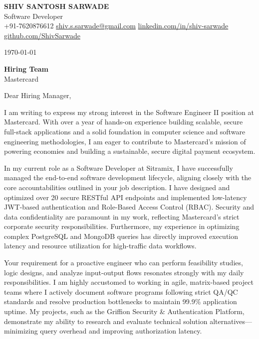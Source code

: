 \documentclass[a4paper,10pt]{article}
\begin{document}
\pagestyle{empty}

\begin{center}
    {\LARGE \textbf{SHIV SANTOSH SARWADE}}\\
    Software Developer\\[4pt]
    +91-7620876612 \quad
    \href{mailto:shiv.s.sarwade@gmail.com}{shiv.s.sarwade@gmail.com} \quad
    \href{https://linkedin.com/in/shiv-sarwade}{linkedin.com/in/shiv-sarwade} \quad
    \href{https://github.com/ShivSarwade}{github.com/ShivSarwade}
\end{center}

\vspace{2em}

\today

\textbf{Hiring Team}\\
Mastercard\\
\vspace{1em}

Dear Hiring Manager,

I am writing to express my strong interest in the Software Engineer II position at Mastercard. With over a year of hands-on experience building scalable, secure full-stack applications and a solid foundation in computer science and software engineering methodologies, I am eager to contribute to Mastercard's mission of powering economies and building a sustainable, secure digital payment ecosystem.

In my current role as a Software Developer at Sitramix, I have successfully managed the end-to-end software development lifecycle, aligning closely with the core accountabilities outlined in your job description. I have designed and optimized over 20 secure RESTful API endpoints and implemented low-latency JWT-based authentication and Role-Based Access Control (RBAC). Security and data confidentiality are paramount in my work, reflecting Mastercard's strict corporate security responsibilities. Furthermore, my experience in optimizing complex PostgreSQL and MongoDB queries has directly improved execution latency and resource utilization for high-traffic data workflows.

Your requirement for a proactive engineer who can perform feasibility studies, logic designs, and analyze input-output flows resonates strongly with my daily responsibilities. I am highly accustomed to working in agile, matrix-based project teams where I actively document software programs following strict QA/QC standards and resolve production bottlenecks to maintain 99.9\% application uptime. My projects, such as the Griffion Security \& Authentication Platform, demonstrate my ability to research and evaluate technical solution alternatives—minimizing query overhead and improving authorization latency. 
\end{document}
